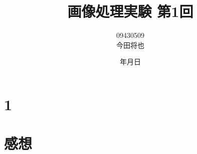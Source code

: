 \documentclass[11pt]{jarticle}
\begin{document}
\title{画像処理実験 第1回}
\author{09430509\\今田将也}
\date{\number\year 年\number\month 月\number\day 日}
\maketitle

\section{1}


\section{感想}
\end{document}

